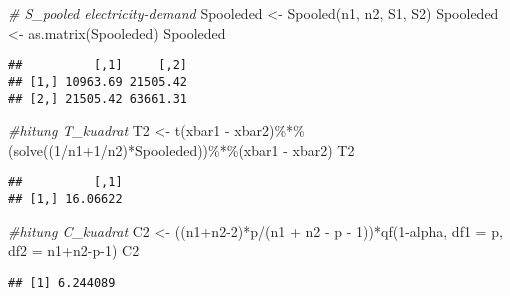 \documentclass[
]{article}
\newenvironment{Shaded}{\begin{snugshade}}{\end{snugshade}}
\newcommand{\AttributeTok}[1]{\textcolor[rgb]{0.77,0.63,0.00}{#1}}
\newcommand{\CommentTok}[1]{\textcolor[rgb]{0.56,0.35,0.01}{\textit{#1}}}
\newcommand{\DecValTok}[1]{\textcolor[rgb]{0.00,0.00,0.81}{#1}}
\newcommand{\FunctionTok}[1]{\textcolor[rgb]{0.00,0.00,0.00}{#1}}
\newcommand{\NormalTok}[1]{#1}
\newcommand{\OtherTok}[1]{\textcolor[rgb]{0.56,0.35,0.01}{#1}}
\newcommand{\SpecialCharTok}[1]{\textcolor[rgb]{0.00,0.00,0.00}{#1}}
\begin{document}
\begin{Shaded}
\begin{Highlighting}[]
\CommentTok{\# S\_pooled electricity{-}demand}
\NormalTok{Spooleded }\OtherTok{\textless{}{-}} \FunctionTok{Spooled}\NormalTok{(n1, n2, S1, S2)}
\NormalTok{Spooleded }\OtherTok{\textless{}{-}} \FunctionTok{as.matrix}\NormalTok{(Spooleded)}
\NormalTok{Spooleded}
\end{Highlighting}
\end{Shaded}

\begin{verbatim}
##          [,1]     [,2]
## [1,] 10963.69 21505.42
## [2,] 21505.42 63661.31
\end{verbatim}

\begin{Shaded}
\begin{Highlighting}[]
\CommentTok{\#hitung T\_kuadrat}
\NormalTok{T2 }\OtherTok{\textless{}{-}} \FunctionTok{t}\NormalTok{(xbar1 }\SpecialCharTok{{-}}\NormalTok{ xbar2)}\SpecialCharTok{\%*\%}\NormalTok{(}\FunctionTok{solve}\NormalTok{((}\DecValTok{1}\SpecialCharTok{/}\NormalTok{n1}\SpecialCharTok{+}\DecValTok{1}\SpecialCharTok{/}\NormalTok{n2)}\SpecialCharTok{*}\NormalTok{Spooleded))}\SpecialCharTok{\%*\%}\NormalTok{(xbar1 }\SpecialCharTok{{-}}\NormalTok{ xbar2)}
\NormalTok{T2}
\end{Highlighting}
\end{Shaded}

\begin{verbatim}
##          [,1]
## [1,] 16.06622
\end{verbatim}

\begin{Shaded}
\begin{Highlighting}[]
\CommentTok{\#hitung C\_kuadrat}
\NormalTok{C2 }\OtherTok{\textless{}{-}}\NormalTok{ ((n1}\SpecialCharTok{+}\NormalTok{n2}\DecValTok{{-}2}\NormalTok{)}\SpecialCharTok{*}\NormalTok{p}\SpecialCharTok{/}\NormalTok{(n1 }\SpecialCharTok{+}\NormalTok{ n2 }\SpecialCharTok{{-}}\NormalTok{ p }\SpecialCharTok{{-}} \DecValTok{1}\NormalTok{))}\SpecialCharTok{*}\FunctionTok{qf}\NormalTok{(}\DecValTok{1}\SpecialCharTok{{-}}\NormalTok{alpha, }\AttributeTok{df1 =}\NormalTok{ p, }\AttributeTok{df2 =}\NormalTok{ n1}\SpecialCharTok{+}\NormalTok{n2}\SpecialCharTok{{-}}\NormalTok{p}\DecValTok{{-}1}\NormalTok{)}
\NormalTok{C2}
\end{Highlighting}
\end{Shaded}

\begin{verbatim}
## [1] 6.244089
\end{verbatim}
\end{document}
